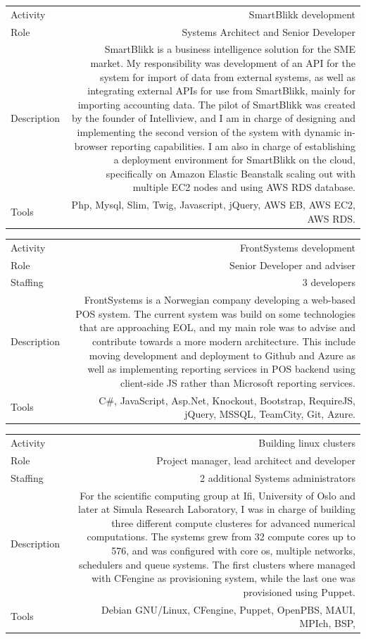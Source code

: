 \documentclass[english,a4paper,11pt]{article}
\begin{document}
\begin{tabular}{@{}LR}
Activity & SmartBlikk development \\ 
Role & Systems Architect and Senior Developer \\ 
Description & SmartBlikk is a business intelligence solution for the SME market. My responsibility was development of an API for the system for import of data from external systems, as well as integrating external APIs for use from SmartBlikk, mainly for importing accounting data. The pilot of SmartBlikk was created by the founder of Intelliview, and I am in charge of designing and implementing the second version of the system with dynamic in-browser reporting capabilities. I am also in charge of establishing a deployment environment for SmartBlikk on the cloud, specifically on Amazon Elastic Beanstalk scaling out with multiple EC2 nodes and using AWS RDS database. \\ 
Tools & Php, Mysql, Slim, Twig, Javascript, jQuery, AWS EB, AWS EC2, AWS RDS. \\ 
\end{tabular}

\begin{tabular}{@{}LR}
Activity & FrontSystems development \\ 
Role & Senior Developer and adviser \\ 
Staffing & 3 developers \\ 
Description & FrontSystems is a Norwegian company developing a web-based POS system. The current system was build on some technologies that are approaching EOL, and my main role was to advise and contribute towards a more modern architecture. This include moving development and deployment to Github and Azure as well as implementing reporting services in POS backend using client-side JS rather than Microsoft reporting services. \\ 
Tools & C\#, JavaScript, Asp.Net, Knockout, Bootstrap, RequireJS, jQuery, MSSQL, TeamCity, Git, Azure. \\ 
\end{tabular}

\begin{tabular}{@{}LR}
Activity & Building linux clusters \\ 
Role & Project manager, lead architect and developer \\ 
Staffing & 2 additional Systems administrators \\ 
Description & For the scientific computing group at Ifi, University of Oslo and later at Simula Research Laboratory, I was in charge of building three different compute clusteres for advanced numerical computations. The systems grew from 32 compute cores up to 576, and was configured with core os, multiple networks, schedulers and queue systems. The first clusters where managed with CFengine as provisioning system, while the last one was provisioned using Puppet. \\ 
Tools & Debian GNU/Linux, CFengine, Puppet, OpenPBS, MAUI, MPIch, BSP,  \\ 
\end{tabular}
\end{document}
